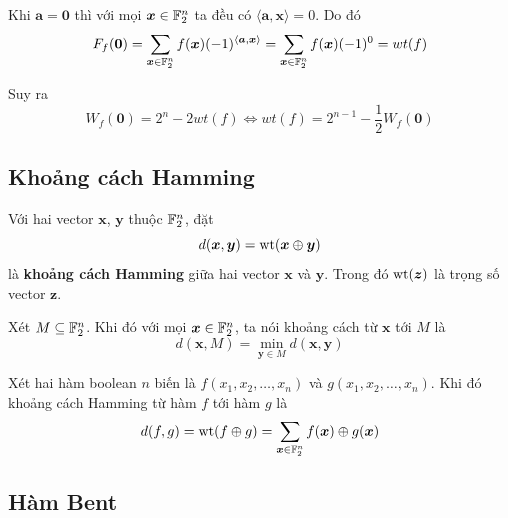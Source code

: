 \begin{remark}
	Khi $\bm{a} = \bm{0}$ thì với mọi $\bm{x} \in \mathbb{F}_2^n$ ta đều có $\langle \bm{a}, \bm{x} \rangle = 0$. Do đó \[F_f (\bm{0}) = \sum_{\bm{x} \in \mathbb{F}_2^n} f(\bm{x}) (-1)^{\langle \bm{a}, \bm{x} \rangle} = \sum_{\bm{x} \in \mathbb{F}_2^n} f(\bm{x}) (-1)^0 = wt(f)\]
	
	Suy ra 
	\begin{equation}\label{walsh:eq4}
		W_f (\bm{0}) = 2^n - 2 wt(f) \Leftrightarrow wt(f) = 2^{n-1} - \frac{1}{2} W_f (\bm{0})
	\end{equation}
\end{remark}
	
\subsection*{Khoảng cách Hamming}

\begin{definition}
	Với hai vector $\bm{x}$, $\bm{y}$ thuộc $\mathbb{F}_2^n$, đặt
	\begin{equation}
		d (\bm{x}, \bm{y}) = \operatorname{wt} (\bm{x} \oplus \bm{y})
	\end{equation}
	là \textbf{khoảng cách Hamming} giữa hai vector $\bm{x}$ và $\bm{y}$. Trong đó $\operatorname{wt}(\bm{z})$ là trọng số vector $\bm{z}$.
\end{definition}

\begin{definition}
	Xét $M \subseteq \mathbb{F}_2^n$. Khi đó với mọi $\bm{x} \in \mathbb{F}_2^n$, ta nói khoảng cách từ $\bm{x}$ tới $M$ là
	\begin{equation}
		d(\bm{x}, M) = \min_{\bm{y} \in M} d (\bm{x}, \bm{y})
	\end{equation}
\end{definition}

\begin{definition}
	Xét hai hàm boolean $n$ biến là $f(x_1, x_2, \ldots, x_n)$ và $g(x_1, x_2, \ldots, x_n)$. Khi đó khoảng cách Hamming từ hàm $f$ tới hàm $g$ là
	\begin{equation}
		d(f, g) = \operatorname{wt}(f \oplus g) = \sum_{\bm{x} \in \mathbb{F}_2^n} f(\bm{x}) \oplus g(\bm{x})
	\end{equation}
\end{definition}

\subsection*{Hàm Bent}

